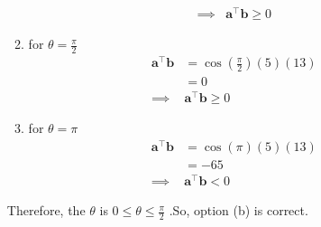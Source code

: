 \documentclass[10pt]{article}
\let\vec\mathbf{}
\begin{document}
\begin{enumerate}
\begin{enumerate}
\begin{align}
\implies &{\vec{a}}^{\top}{\vec{b}}\ge0
\end{align}
\item for $\theta=\frac{\pi}{2}$
\begin{align}
{\vec{a}}^{\top}{\vec{b}}&=\cos(\frac{\pi}{2})(5)(13) \\
&=0\\
\implies &{\vec{a}}^{\top}{\vec{b}}\ge0
\end{align}
\item for $\theta=\pi$ 
\begin{align}
{\vec{a}}^{\top}{\vec{b}}&=\cos(\pi)(5)(13)\\
&=-65\\
\implies &{\vec{a}}^{\top}{\vec{b}}<0
\end{align}
\end{enumerate}
Therefore, the $\theta$ is $0\le\theta\le\frac{\pi}{2}$ .So, option (b) is correct.
\end{enumerate}
\end{document}
